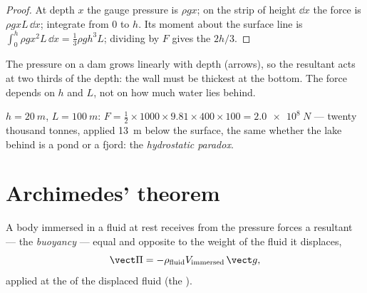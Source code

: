 \begin{proof}
At depth $x$ the gauge pressure is $\rho gx$; on the strip of height
$\dd x$ the force is $\rho gxL\,\dd x$; integrate from $0$ to $h$. Its
moment about the surface line is $\int_0^h\rho gx^2L\,\dd x = \tfrac13\rho gh^3L$;
dividing by $F$ gives the  $2h/3$.
\end{proof}

\begin{omfigure}

{\small The pressure on a dam grows linearly with depth (arrows), so the
resultant acts at two thirds of the depth: the wall must be thickest at
the bottom. The force depends on $h$ and $L$, not on how much water
lies behind.}
\end{omfigure}

\begin{example}[A dam]\label{ex:b1:fluid-statics:dam}
$h = \qty{20}{m}$, $L = \qty{100}{m}$: $F = \tfrac12 \times 1000 \times 9.81 \times
400 \times 100 = \qty{2.0e8}{N}$ --- twenty thousand tonnes, applied
\qty{13}{m} below the surface, the same whether the lake behind is a pond
or a fjord: the \emph{hydrostatic paradox}.
\end{example}

\section{Archimedes' theorem}

\begin{theorem}[Archimedes]\label{thm:b1:fluid-statics:archimedes}
A body immersed in a fluid at rest receives from the pressure forces a
resultant --- the \emph{buoyancy} --- equal and opposite to the weight of
the fluid it displaces,
\[
\vect\Pi = -\rho_{\text{fluid}}V_{\text{immersed}}\,\vect g ,
\]
applied at the  of the displaced fluid (the \emph{}).
\end{theorem}

